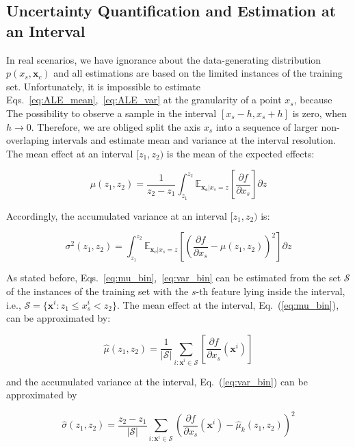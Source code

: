 \documentclass[twoside]{article}
\newcommand{\dfdx}{\frac{\partial f}{\partial x_s}}
\newcommand{\xc}{\mathbf{x_c}}
\begin{document}
\subsection{Uncertainty Quantification and Estimation at an Interval}

In real scenarios, we have ignorance about the data-generating
distribution \(p(x_s, \mathbf{x}_c)\) and all estimations are based on
the limited instances of the training set. Unfortunately, it is
impossible to estimate Eqs.~\eqref{eq:ALE_mean},~\eqref{eq:ALE_var} at
the granularity of a point \(x_s\), because The possibility to observe
a sample in the interval \([x_s - h, x_s + h]\) is zero, when
\(h \to 0\). Therefore, we are obliged split the axis \(x_s\) into a
sequence of larger non-overlaping intervals and estimate mean and
variance at the interval resolution. The mean effect at an interval
\([z_1, z_2)\) is the mean of the expected effects:

\begin{equation}
  \label{eq:mu_bin}
  \mu(z_1, z_2) = \frac{1}{z_2 - z_1} \int_{z_1}^{z_2}
  \mathbb{E}_{\xc|x_s=z}\left [\frac{\partial f}{\partial x_s} \right ] \partial z
\end{equation}

\noindent
Accordingly, the accumulated variance at an interval \([z_1, z_2)\)
is:

\begin{equation}
  \label{eq:var_bin}
  \sigma^2(z_1, z_2) = \int_{z_1}^{z_2}
  \mathbb{E}_{\xc|x_s=z} \left [ (\frac{\partial
      f}{\partial x_s} - \mu(z_1, z_2) )^2 \right] \partial z
\end{equation}

As stated before, Eqs.~\eqref{eq:mu_bin},~\eqref{eq:var_bin} can be
estimated from the set \(\mathcal{S}\) of the instances of the
training set with the \(s\)-th feature lying inside the interval,
i.e., \( \mathcal{S}= \{ \mathbf{x}^i : z_1 \leq x^i_s < z_2 \}
\). The mean effect at the interval, Eq.~(\ref{eq:mu_bin}), can be
approximated by:

\begin{equation}
  \label{eq:mean_estimation}
  \hat{\mu}(z_1, z_2) = \frac{1}{|\mathcal{S}|} \sum_{i:\mathbf{x}^i \in
    \mathcal{S}} \left [ \dfdx(\mathbf{x}^i) \right ]
\end{equation}

and the accumulated variance at the interval, Eq.~(\ref{eq:var_bin})
can be approximated by

\begin{equation}
  \label{eq:variance_estimation}
  \hat{\sigma}(z_1, z_2) = \frac{z_2 - z_1}{|\mathcal{S}|} \sum_{i:\mathbf{x}^i \in
    \mathcal{S}} \left ( \dfdx(\mathbf{x}^i) - \hat{\mu}_k(z_1, z_2) \right )^2
\end{equation}
\end{document}
